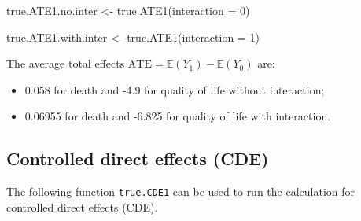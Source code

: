 \documentclass[
]{book}
\newenvironment{Shaded}{\begin{snugshade}}{\end{snugshade}}
\newcommand{\AttributeTok}[1]{\textcolor[rgb]{0.77,0.63,0.00}{#1}}
\newcommand{\DecValTok}[1]{\textcolor[rgb]{0.00,0.00,0.81}{#1}}
\newcommand{\FunctionTok}[1]{\textcolor[rgb]{0.00,0.00,0.00}{#1}}
\newcommand{\NormalTok}[1]{#1}
\newcommand{\OtherTok}[1]{\textcolor[rgb]{0.56,0.35,0.01}{#1}}
\providecommand{\tightlist}{%
  \setlength{\itemsep}{0pt}\setlength{\parskip}{0pt}}
\begin{document}
\begin{Shaded}
\begin{Highlighting}[]
\NormalTok{true.ATE1.no.inter }\OtherTok{\textless{}{-}} \FunctionTok{true.ATE1}\NormalTok{(}\AttributeTok{interaction =} \DecValTok{0}\NormalTok{)}

\NormalTok{true.ATE1.with.inter }\OtherTok{\textless{}{-}} \FunctionTok{true.ATE1}\NormalTok{(}\AttributeTok{interaction =} \DecValTok{1}\NormalTok{)}
\end{Highlighting}
\end{Shaded}

The average total effects \(\text{ATE} = \mathbb{E}(Y_1) - \mathbb{E}(Y_0)\) are:

\begin{itemize}
\tightlist
\item
  0.058 for death and -4.9 for quality of life without interaction;
\item
  0.06955 for death and -6.825 for quality of life with interaction.
\end{itemize}

\hypertarget{controlled-direct-effects-cde}{%
\subsection{Controlled direct effects (CDE)}\label{controlled-direct-effects-cde}}

The following function \texttt{true.CDE1} can be used to run the calculation for controlled direct effects (CDE).
\end{document}
